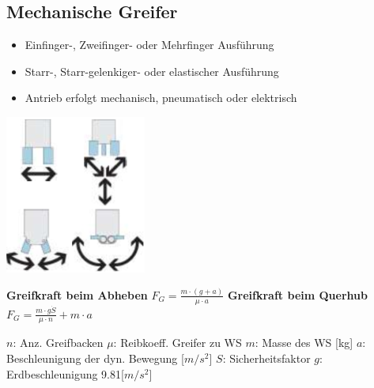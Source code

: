\begin{minipage}{0.5\linewidth}
    \subsection{Mechanische Greifer}
        \begin{itemize}
            \item Einfinger-, Zweifinger- oder Mehrfinger Ausführung
            \item Starr-, Starr-gelenkiger- oder elastischer Ausführung
            \item Antrieb erfolgt mechanisch, pneumatisch oder elektrisch
        \end{itemize}
    \begin{center}
        \includegraphics[width=0.3\linewidth]{./bilder/GreiferAusfurung}
    \end{center}
    \begin{minipage}{0.49\linewidth}
        \textbf{Greifkraft beim Abheben}\newline
        \null\qquad$F_G=\frac{m \cdot (g + a)}{\mu \cdot a} $\newline
        \textbf{Greifkraft beim Querhub}\newline
         \null\qquad$F_G=\frac{m \cdot g \dot S}{\mu \cdot n} + m \cdot a $
    \end{minipage}
    \begin{minipage}{0.5\linewidth}
    $n$: Anz. Greifbacken\newline
    $\mu$: Reibkoeff. Greifer zu WS\newline
    $m$: Masse des WS [kg]\newline
    $a$: Beschleunigung der dyn. Bewegung [$m/s^2$]\newline
    $S$: Sicherheitsfaktor\newline
    $g$: Erdbeschleunigung 9.81[$m/s^2$]
    \end{minipage}
\end{minipage}

